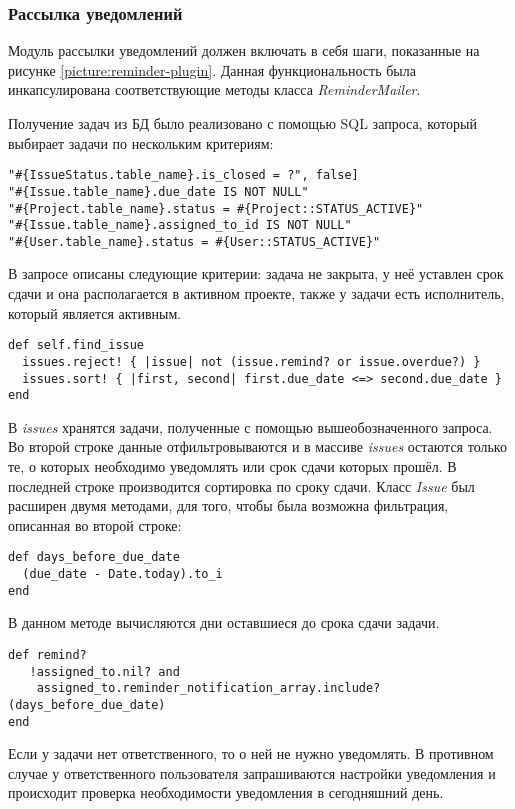 \subsubsection{Рассылка уведомлений}
Модуль рассылки уведомлений должен включать в себя шаги, показанные на рисунке
\ref{picture:reminder-plugin}. Данная функциональность была инкапсулирована
соответствующие методы класса \textit{ReminderMailer}.

Получение задач из БД было реализовано с помощью SQL запроса, который выбирает
задачи по нескольким критериям:
\small{\begin{lstlisting}
"#{IssueStatus.table_name}.is_closed = ?", false]
"#{Issue.table_name}.due_date IS NOT NULL"
"#{Project.table_name}.status = #{Project::STATUS_ACTIVE}"
"#{Issue.table_name}.assigned_to_id IS NOT NULL"
"#{User.table_name}.status = #{User::STATUS_ACTIVE}"
\end{lstlisting}}
В запросе описаны следующие критерии: задача не закрыта, у неё уставлен срок
сдачи и она располагается в активном проекте, также у задачи есть исполнитель,
который является активным. 
\small{\begin{lstlisting}
def self.find_issue
  issues.reject! { |issue| not (issue.remind? or issue.overdue?) }
  issues.sort! { |first, second| first.due_date <=> second.due_date }
end
\end{lstlisting}}
В \textit{issues} хранятся задачи, полученные с помощью вышеобозначенного
запроса. Во второй строке данные отфильтровываются и в массиве \textit{issues}
остаются только те, о которых необходимо уведомлять или срок сдачи которых
прошёл. В последней строке производится сортировка по сроку сдачи. Класс
\textit{Issue} был расширен двумя методами, для того, чтобы была возможна
фильтрация, описанная во второй строке:
\small{\begin{lstlisting}
def days_before_due_date
  (due_date - Date.today).to_i
end
\end{lstlisting}}
В данном методе вычисляются дни оставшиеся до срока сдачи задачи.
\small{\begin{lstlisting}
def remind?
   !assigned_to.nil? and
    assigned_to.reminder_notification_array.include?(days_before_due_date)
end
\end{lstlisting}}
Если у задачи нет ответственного, то о ней не нужно уведомлять. В противном
случае у ответственного пользователя запрашиваются настройки уведомления и
происходит проверка необходимости уведомления в сегодняшний день.

